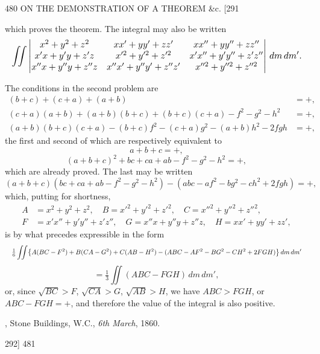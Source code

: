 \documentclass[11pt]{article}
\begin{document}
\newpage
\begin{center}
480 \hfill ON THE DEMONSTRATION OF A THEOREM \&c. \hfill \textsc{[291}
\end{center}

which proves the theorem. The integral may also be written
\[ \resizebox{\textwidth}{!}{$\displaystyle
\iint\begin{vmatrix}
x^{2}+y^{2}+z^{2} & xx'+yy'+zz' & xx''+yy''+zz'' \\
x'x+y'y+z'z & x'^{2}+y'^{2}+z'^{2} & x'x''+y'y''+z'z'' \\
x''x+y''y+z''z & x''x'+y''y'+z''z' & x''^{2}+y''^{2}+z''^{2}
\end{vmatrix}\,dm\,dm'.$} \]

The conditions in the second problem are
\[ \begin{aligned}
(b+c)+(c+a)+(a+b) &= +,\\
(c+a)(a+b)+(a+b)(b+c)+(b+c)(c+a)-f^{2}-g^{2}-h^{2} &= +,\\
(a+b)(b+c)(c+a)-(b+c)f^{2}-(c+a)g^{2}-(a+b)h^{2}-2fgh &= +,
\end{aligned} \]
the first and second of which are respectively equivalent to
\[ a+b+c=+, \]
\[ (a+b+c)^{2}+bc+ca+ab-f^{2}-g^{2}-h^{2}=+, \]
which are already proved. The last may be written
\[ (a+b+c)(bc+ca+ab-f^{2}-g^{2}-h^{2})-(abc-af^{2}-bg^{2}-ch^{2}+2fgh)=+, \]
which, putting for shortness,
\[ \begin{aligned}
A &= x^{2}+y^{2}+z^{2},\quad B=x'^{2}+y'^{2}+z'^{2},\quad C=x''^{2}+y''^{2}+z''^{2},\\
F &= x'x''+y'y''+z'z'',\quad G=x''x+y''y+z''z,\quad H=xx'+yy'+zz',
\end{aligned} \]
is by what precedes expressible in the form
\[ \resizebox{\textwidth}{!}{$\displaystyle
\tfrac{1}{6}\iint\bigl\{A(BC-F^{2})+B(CA-G^{2})+C(AB-H^{2})-(ABC-AF^{2}-BG^{2}-CH^{2}+2FGH)\bigr\}\,dm\,dm'$} \]
\[ =\tfrac{1}{3}\iint(ABC-FGH)\,dm\,dm', \]
or, since $\sqrt{BC}>F$, $\sqrt{CA}>G$, $\sqrt{AB}>H$, we have $ABC>FGH$, or $ABC-FGH=+$,
and therefore the value of the integral is also positive.

\medskip
{}, Stone Buildings, W.C., \textit{6th March}, 1860.

\newpage
\begin{center}
\textsc{292]} \hfill 481
\end{center}
\end{document}
